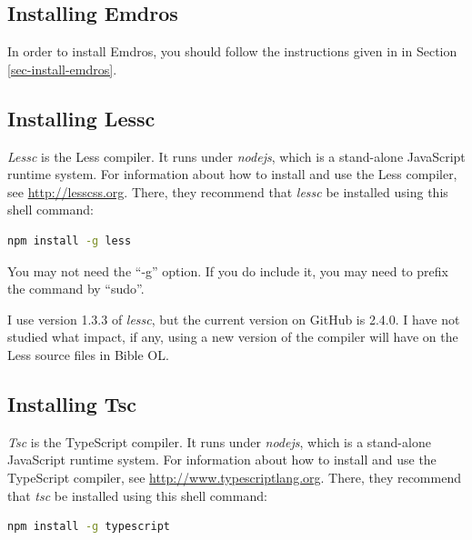 \documentclass[11pt,oneside,a4paper]{memoir}
\begin{document}
\subsection{Installing Emdros}\label{sec-install-start}
 
In order to install Emdros, you should follow the instructions given in in Section
\ref{sec-install-emdros}.
 
 
\subsection{Installing Lessc}\label{sec-installing-lessc}
 
\emph{Lessc} is the Less compiler. It runs under \emph{nodejs}, which is
a stand-alone JavaScript runtime system. For information about how to install and use the Less
compiler, see \url{http://lesscss.org}. There, they recommend that \emph{lessc} be installed using
this shell command:
 
\begin{lstlisting}[language=bash]
npm install -g less
\end{lstlisting}
 
You may not need the ``-g'' option. If you do include it, you may need to prefix the command by
``sudo''.
 
I use version 1.3.3 of \emph{lessc}, but the current version on GitHub is 2.4.0. I have not studied
what impact, if any, using a new version of the compiler will have on the Less source files in Bible
OL.

\subsection{Installing Tsc}\label{sec-installing-tsc}\label{sec-install-end}
 
\emph{Tsc} is the TypeScript compiler. It
runs under \emph{nodejs}, which is a stand-alone JavaScript runtime
system. For information about how to install and use the TypeScript compiler, see
\url{http://www.typescriptlang.org}. There, they recommend that \emph{tsc} be installed using this
shell command:
 
\begin{lstlisting}[language=bash]
npm install -g typescript
\end{lstlisting}
 
\end{document}

